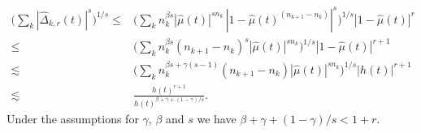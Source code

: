 \documentclass[11pt]{amsart}
\theoremstyle{definition}
\theoremstyle{remark}
\begin{document}
\begin{align}
\Big( \sum_k   |\hat\Delta_{k,r}(t)|^{s}  \Big)^{1/s}
\le  & \Big( \sum_k  n_k^{\beta s}  |\hat\mu(t)|^{sn_k} \, |1-\hat\mu(t)^{(n_{k+1}-n_k)}|^s \Big)^{1/s} |1-\hat\mu(t)|^r \nonumber \\
%
 \le &  \Big( \sum_k n_k^{\beta s} (n_{k+1}-n_k)^s |\hat\mu(t)|^{s n_k}  \Big)^{1/s}  |1-\hat\mu(t)|^{r+1} \nonumber \\
 \lesssim & \Big( \sum_k n_k^{\beta s+\gamma (s-1)} (n_{k+1}-n_k) |\hat\mu(t)|^{s n_k}  \Big)^{1/s}  |h(t)|^{r+1}   \nonumber \\
 \lesssim & \frac{h(t)^{r+1}}{ h(t)^{\beta+\gamma+(1-\gamma)/s}}. \label{eq:nk} 
\end{align}
Under the assumptions for $\gamma$, $\beta$ and $s$ we have
$\beta+\gamma+(1-\gamma)/s <1+r$.
\end{document}
